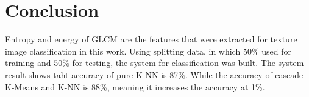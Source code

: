 \documentclass[conference]{IEEEtran}
\begin{document}
%





\section{Conclusion}

Entropy and energy of GLCM are the features that were extracted for texture image classification in this work. Using splitting data, in which 50\% used for training and 50\% for testing, the system for classification was built. The system result shows taht accuracy of pure K-NN is 87\%. While the accuracy of cascade K-Means and K-NN is 88\%, meaning it increases the accuracy at 1\%. 



%
\end{document}
